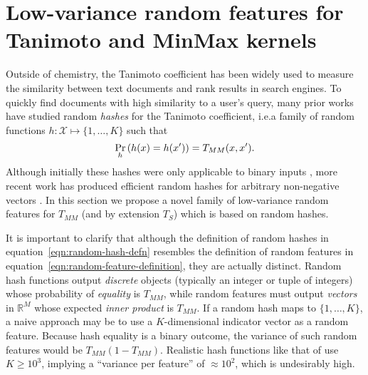 \section{Low-variance random features for Tanimoto and MinMax kernels}\label{sec:minmax-rf}

Outside of chemistry, the Tanimoto coefficient has been widely used to measure the similarity
between text documents
and rank results in search engines.
To quickly find documents with high similarity to a user's query,
many prior works have studied random
\emph{hashes} for the Tanimoto coefficient,
i.e.\@ a family of random functions $h:\mathcal{X}\mapsto\{1,\ldots,K\}$ such that
\begin{equation}\label{eqn:random-hash-defn}
    \Pr_h \left( h(x) = h(x') \right) = T_{MM}(x,x').
\end{equation}
Although initially these hashes were only applicable to binary inputs
\citep{broder1997resemblance,broder1998min,charikar2002similarity},
more recent work has produced efficient random hashes for arbitrary non-negative vectors
\citep{manasse2010consistent,ioffe2010improved,shrivastava2016simple}.
In this section we propose a novel family of low-variance random features for $T_{MM}$
(and by extension $T_{S}$) which is based on random hashes.

It is important to clarify that although the definition of random hashes in equation~\ref{eqn:random-hash-defn}
resembles the definition of random features in equation~\ref{eqn:random-feature-definition},
they are actually distinct.
Random hash functions output \emph{discrete} objects (typically an integer or tuple of integers)
whose probability of \emph{equality} is $T_{MM}$,
while random features must output \emph{vectors} in $\mathbb{R}^M$ whose expected \emph{inner product}
is $T_{MM}$.
If a random hash maps to $\{1,\ldots,K\}$,
a naive approach may be to use a $K$-dimensional indicator vector as a random feature.
Because hash equality is a binary outcome,
the variance of such random features would be $T_{MM}\left(1-T_{MM}\right)$.
Realistic hash functions like that of \citet{ioffe2010improved}
use $K\ge 10^3$,
implying a ``variance per feature'' of $\approx 10^2$,
which is undesirably high.

